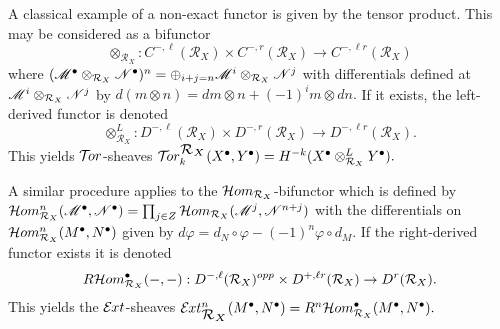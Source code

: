 A classical example of a non-exact functor is given by the tensor product.
This may be considered as a bifunctor
$$ \otimes_{\mathcal{R}_X} : C^{-,\ell}(\mathcal{R}_X)\times C^{-,r}(\mathcal{R}_X)\to C^{-,\ell r}(\mathcal{R}_X)$$
where
$(\mathscr{M}^\bullet \otimes_{\mathcal{R}_X} \mathscr{N}^\bullet)^n = \oplus_{i + j = n} \mathscr{M}^i \otimes_{\mathcal{R}_X} \mathscr{N}^j $
with differentials defined at $\mathscr{M}^i \otimes_{\mathcal{R}_X} \mathscr{N}^j$ by
$d(m\otimes n) = dm \otimes n + (-1)^i m \otimes dn.$
If it exists, the left-derived functor is denoted
$$ \otimes_{\mathcal{R}_X}^L : D^{-,\ell}(\mathcal{R}_X)\times D^{-,r}(\mathcal{R}_X)\to D^{-,\ell r}(\mathcal{R}_X).$$
This yields $\mathcal{T}\mkern -3mu or$-sheaves
$\Tr{\mathcal{R}_X}{k}(X^\bullet, Y^\bullet) = H^{-k}(X^\bullet\otimes_{\mathcal{R}_X}^L Y^\bullet).$

A similar procedure applies to the $\mathcal{H}om_{\mathcal{R}_X}$-bifunctor which is defined by
$\mathcal{H}om_{\mathcal{R}_X}^n(\mathscr{M}^\bullet, \mathscr{N}^\bullet) \allowbreak = \prod_{j\in Z} \mathcal{H}om_{\mathcal{R}_X}(\mathscr{M}^j , \mathscr{N}^{n+j}) $
with the differentials on $\mathcal{H}om_{\mathcal{R}_X}^n(M^\bullet,N^\bullet)$ given by $d\varphi = d_N\circ \varphi - (-1)^n \varphi \circ d_M$.
If the right-derived functor exists it is denoted
$$R\mathcal{H}om_{\mathcal{R}_X}^\bullet({-},{-}): D^{-,\ell}(\mathcal{R}_X)^{opp}\times D^{+,\ell r}(\mathcal{R}_X)\to D^{r}(\mathcal{R}_X).$$
This yields the $\mathcal{E}\mkern -1mu xt$-sheaves
$\Ex{\mathcal{R}_X}{n}(M^\bullet,N^\bullet) =  R^n\Hom_{\mathcal{R}_X}^\bullet(M^\bullet, N^\bullet).$
